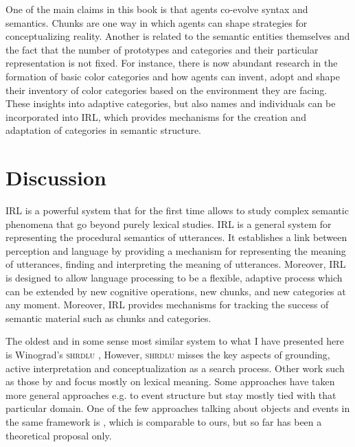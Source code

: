 One of the main claims in this book is that agents co-evolve syntax 
and semantics. Chunks are one way in which agents can
shape strategies for conceptualizing reality. Another
is related to the semantic entities themselves and the fact that the
number of prototypes and categories and their particular 
representation is not fixed. For instance, there is now 
abundant research in the formation of basic color categories 
\citep{steels2005coordinating,belpaeme2007language}
and how agents can invent, adopt and shape their inventory
of color categories based on the environment they are
facing. These insights into adaptive categories,
but also names and individuals can be incorporated into
IRL, which provides mechanisms for the creation and
adaptation of categories in semantic structure.


\section{Discussion}
IRL is a powerful system that for the first time allows 
to study complex semantic phenomena that go beyond
purely lexical studies. IRL is a general system for 
representing the procedural semantics
of utterances. It establishes a link between perception and
language by providing a mechanism for representing the meaning
of utterances, finding and interpreting the meaning of utterances.
Moreover, IRL is designed to allow language processing
to be a flexible, adaptive process which can be extended
by new cognitive operations, new chunks, and new categories 
at any moment. Moreover, IRL provides mechanisms for
tracking the success of semantic material such as 
chunks and categories. 


The oldest and in some sense most similar system 
to what I have presented here is Winograd's \textsc{shrdlu} 
\citep{haddock1989computational,winograd1971procedures}, However, \textsc{shrdlu} misses the key aspects of grounding, active interpretation and conceptualization 
as a search process. Other work such as those by \cite{bailey1997modeling}
and \cite{siskind2001grounding} 
focus mostly on lexical meaning. Some approaches
have taken more general approaches e.g. to event structure \citep{narayanan1999moving} 
but stay mostly tied with that particular domain. One of the few approaches talking about 
objects and events in the same framework is , which is comparable 
to ours, but so far has been a theoretical proposal only.


%
% 
%



